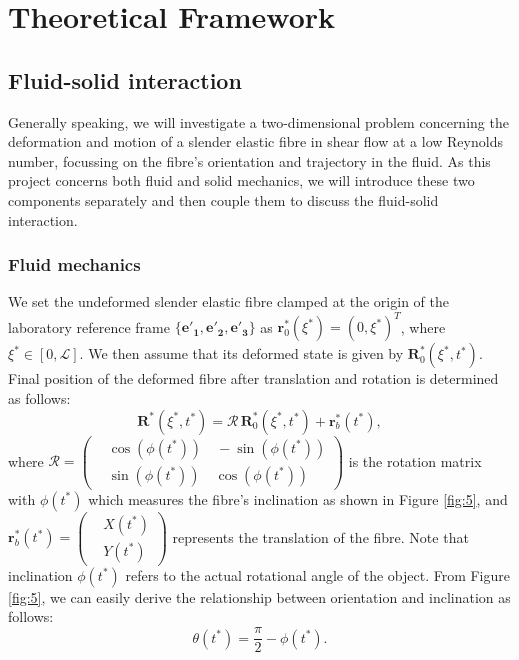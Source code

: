 \documentclass[lineno]{JFM-FLM_Au}
\begin{document}
\section{Theoretical Framework}

\subsection{Fluid-solid interaction}
Generally speaking, we will investigate a two-dimensional problem concerning the deformation and motion of a slender elastic fibre in shear flow at a low Reynolds number, focussing on the fibre's orientation and trajectory in the fluid. As this project concerns both fluid and solid mechanics, we will introduce these two components separately and then couple them to discuss the fluid-solid interaction.
\subsubsection{Fluid mechanics}
We set the undeformed slender elastic fibre clamped at the origin of the laboratory reference frame $\{\mathbf{e'_1}, \mathbf{e'_2}, \mathbf{e'_3}\}$ as
$\mathbf{r}_0^*(\xi^*)=(0,\xi^*)^T$, where $\xi^*\in [0,\mathcal{L}]$. We then assume that its deformed state is given by $\mathbf{R}_0^*(\xi^*,t^*)$. 
Final position of the deformed fibre after translation and rotation is determined as follows:
\begin{equation}
	\label{eqn:19}
	\mathbf{R}^*(\xi^*,t^*)=\mathbf{\mathcal{R}}\,\mathbf{R}_0^*(\xi^*,t^*)+\mathbf{r}_b^*(t^*),
\end{equation}
where $\mathbf{\mathcal{R}}=\left(\begin{aligned}
	&\cos(\phi(t^*))\quad -\sin(\phi(t^*)) \\
	&\sin(\phi(t^*))\quad \cos(\phi(t^*))
\end{aligned}\right)$ is the rotation matrix with $\phi(t^*)$ which measures the fibre's inclination as shown in Figure \ref{fig:5}, and $\mathbf{r}_b^*(t^*)=\left(\begin{aligned}
	&X(t^*) \\
	&Y(t^*)
\end{aligned}\right)$ represents the translation of the fibre. Note that inclination $\phi(t^*)$ refers to the actual rotational angle of the object. From Figure \ref{fig:5}, we can easily derive the relationship between orientation and inclination as follows:
\begin{equation}
	\label{eqn:20}
	\theta(t^*)=\frac{\pi}{2}-\phi(t^*).
\end{equation}
\end{document}
